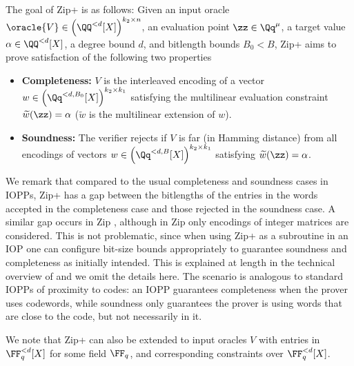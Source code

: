  The goal of Zip+ is as follows: Given an input oracle $\oracle{V} \in \left(\QQ^{<d}[X]\right)^{k_2 \times n}$, an evaluation point $\zz \in \Qq^{\mu}$, a target value $\alpha \in \QQ^{<d}[X]$, a degree bound $d$, and bitlength bounds $B_0 < B$, Zip+ aims to prove satisfaction of the following two properties
\begin{itemize}
  \item \textbf{Completeness:} $V$ is the interleaved encoding of a vector $w \in \left(\Qq^{< d, B_0}[X]\right)^{k_2 \times k_1}$ satisfying the multilinear evaluation constraint $\widetilde{w}(\zz) = \alpha$ ($\widetilde{w}$ is the multilinear extension of $w$).
  \item \textbf{Soundness:} The verifier rejects if $V$ is far (in Hamming distance) from all encodings of vectors $w \in \left(\Qq^{< d, B}[X]\right)^{k_2 \times k_1}$ satisfying $\widetilde{w}(\zz) = \alpha$.
\end{itemize}
We remark that compared to the usual completeness and soundness cases in IOPPs, Zip+ has a gap between the bitlengths of the entries in the words accepted in the completeness case and those rejected in the soundness case. A similar gap occurs in Zip \cite{Zinc}, although in Zip only encodings of integer matrices are considered. This is not problematic, since when using Zip+ as a subroutine in an IOP one can configure bit-size bounds appropriately to guarantee soundness and completeness as initially intended. This is explained at length in the technical overview of \cite{Zinc} and we omit the details here. The scenario is analogous to standard IOPPs of proximity to codes: an IOPP guarantees completeness when the prover uses codewords, while soundness only guarantees the prover is using words that are close to the code, but not necessarily in it.

We note that Zip+ can also be extended to input oracles $V$ with entries in $\FF_q^{<d}[X]$ for some field $\FF_q$, and corresponding constraints over $\FF_q^{<d}[X]$. 


%

